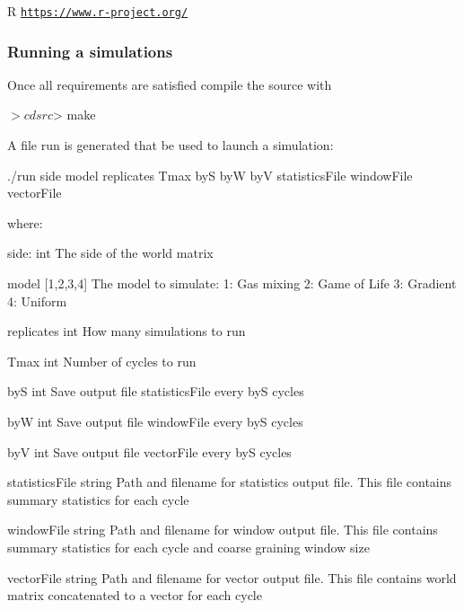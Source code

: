 \begin{DoxyItemize}
\item R \href{https://www.r-project.org/}{\tt https\+://www.\+r-\/project.\+org/}
\end{DoxyItemize}

\subsubsection*{Running a simulations}

Once all requirements are satisfied compile the source with


\begin{DoxyCode}
$> cd src
$> make
\end{DoxyCode}


A file {\ttfamily run} is generated that be used to launch a simulation\+:


\begin{DoxyCode}
./run side model replicates Tmax byS byW byV statisticsFile windowFile vectorFile

where:

side:           int       The side of the world matrix

model           [1,2,3,4] The model to simulate:
                            1:     Gas mixing
                            2:     Game of Life
                            3:     Gradient
                            4:     Uniform

replicates      int       How many simulations to run

Tmax            int       Number of cycles to run

byS             int       Save output file statisticsFile every byS cycles

byW             int       Save output file windowFile every byS cycles

byV             int       Save output file vectorFile every byS cycles

statisticsFile  string    Path and filename for statistics output file. This
                          file contains summary statistics for each cycle

windowFile      string    Path and filename for window output file. This file
                          contains summary statistics for each cycle and coarse
                          graining window size

vectorFile      string    Path and filename for vector output file. This file
                          contains world matrix concatenated to a vector for
                          each cycle
\end{DoxyCode}


